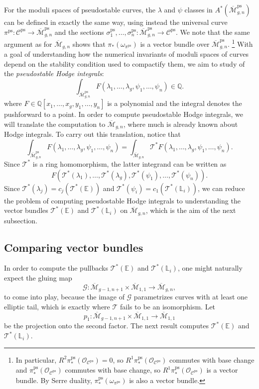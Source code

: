 \documentclass[12pt]{amsart}
\theoremstyle{definition}
\newcommand{\M}{\overline{\mathcal{M}}}
\newcommand{\ps}{\mathrm{ps}}
\newcommand{\T}{\mathcal{T}}
\newcommand{\bE}{\mathbb{E}}
\newcommand{\G}{\mathcal{G}}
\newcommand{\C}{\mathcal{C}}
\renewcommand{\L}{\mathbb{L}}
\newcommand{\Q}{\mathbb{Q}}
\numberwithin{equation}{section}
\begin{document}
For the moduli spaces of pseudostable curves, the $\lambda$ and $\psi$ classes in $A^*(\M_{g,n}^\ps)$ can be defined in exactly the same way, using instead the universal curve $\pi^{\ps}:\C^\ps\rightarrow\M_{g,n}^\ps$ and the sections $\sigma_1^\ps,\dots,\sigma_n^\ps:\M_{g,n}^\ps\rightarrow\C^\ps$.  We note that the same argument as for $\M_{g,n}$ shows that $\pi_*(\omega_{\pi^{\ps}})$ is a vector bundle over $\M_{g,n}^{\ps}$.%
\footnote{In particular, $R^2 \pi^\ps_*(\mathcal O_{\C^\ps}) = 0$, so $R^1 \pi^\ps_*(\mathcal O_{\C^\ps})$ commutes with base change and $\pi^\ps_*(\mathcal O_{\C^\ps})$ commutes with base change, so $R^1 \pi^\ps_*(\mathcal O_{\C^\ps})$ is a vector bundle.  By Serre duality, $\pi^\ps_*(\omega_{\pi^\ps})$ is also a vector bundle.}
With a goal of understanding how the numerical invariants of moduli spaces of curves depend on the stability condition used to compactify them, we aim to study of the \emph{pseudostable Hodge integrals}:
\[
\int_{\M_{g,n}^\ps}F(\lambda_1,\dots,\lambda_g,\psi_1,\dots,\psi_n)\in\Q.
\]
where $F\in\Q[x_1,\dots,x_g,y_1,\dots,y_n]$ is a polynomial and the integral denotes the pushforward to a point. In order to compute pseudostable Hodge integrals, we will translate the computation  to $\M_{g,n}$, where much is already known about Hodge integrals. To carry out this translation, notice that
\[
\int_{\M_{g,n}^\ps}F(\lambda_1,\dots,\lambda_g,\psi_1,\dots,\psi_n)=\int_{\M_{g,n}}\T^*F(\lambda_1,\dots,\lambda_g,\psi_1,\dots,\psi_n).
\]
Since $\T^*$ is a ring homomorphism, the latter integrand can be written as
\[
F(\T^*(\lambda_1),\dots,\T^*(\lambda_g),\T^*(\psi_1),\dots,\T^*(\psi_n)).
\] 
Since $\T^*(\lambda_j)=c_j(\T^*(\bE))$ and $\T^*(\psi_i)=c_1(\T^*(\L_i))$, we can reduce the problem of computing pseudostable Hodge integrals to understanding the vector bundles $\T^*(\bE)$ and $\T^*(\L_i)$ on $\M_{g,n}$, which is the aim of the next subsection.

\subsection{Comparing vector bundles}

In order to compute the pullbacks $\T^*(\bE)$ and $\T^*(\L_i)$, one might naturally expect the gluing map 
\[
\G:\M_{g-1,n+1}\times \M_{1,1}\rightarrow\M_{g,n},
\]
to come into play, because the image of $\G$ parametrizes curves with at least one elliptic tail, which is exactly where $\T$ fails to be an isomorphism. Let
\[
p_1:\M_{g-1,n+1}\times \M_{1,1}\rightarrow\M_{1,1}
\] 
be the projection onto the second factor. The next result computes $\T^*(\bE)$ and $\T^*(\L_i)$.
\end{document}
